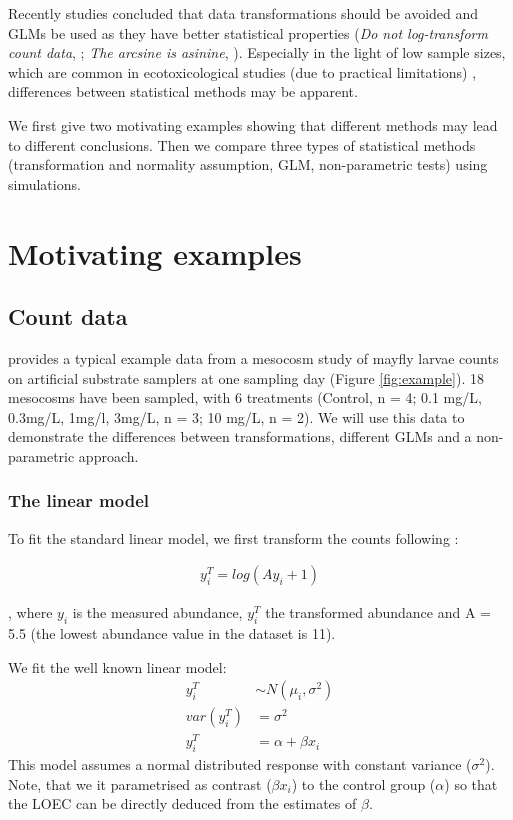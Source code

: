 \documentclass{scrartcl}
\begin{document}
Recently studies concluded that data transformations should be avoided and GLMs be used as they have better statistical properties (\emph{Do not log-transform count data}, \citep{ohara_not_2010}; \emph{The arcsine is asinine}, \citep{warton_arcsine_2011}).
Especially in the light of low sample sizes, which are common in ecotoxicological studies (due to practical limitations) \citep{sanderson_pesticide_2002,szocs_analysing_2015}, differences between statistical methods may be apparent. 

We first give two motivating examples showing that different methods may lead to different conclusions. 
Then we compare three types of statistical methods (transformation and normality assumption, GLM, non-parametric tests) using simulations.


\section{Motivating examples}
\subsection{Count data}
\citet{brock_minimum_2014} provides a typical example data from a mesocosm study of mayfly larvae counts on artificial substrate samplers at one sampling day (Figure \ref{fig:example}). 
18 mesocosms have been sampled, with 6 treatments (Control, n = 4; 0.1 mg/L, 0.3mg/L, 1mg/l, 3mg/L, n = 3; 10 mg/L, n = 2).
We will use this data to demonstrate the differences between transformations, different GLMs and a non-parametric approach.

\subsubsection{The linear model}
To fit the standard linear model, we first transform the counts following \citet{van_den_brink_impact_2000}:

\begin{align}
  y^T_i = log(Ay_i + 1) \label{eqn:trans}
\end{align}

, where $y_i$ is the measured abundance, $y_i^T$ the transformed abundance and A = 5.5 (the lowest abundance value in the dataset is 11).

We fit the well known linear model:
\begin{align}
  y_i^T &\sim N(\mu_i, \sigma^2) \nonumber \\
  var(y_i^T) &= \sigma^2 \label{eqn:normal} \\
  y_i^T &= \alpha + \beta x_i \nonumber
\end{align}
This model assumes a normal distributed response with constant variance ($\sigma^2$).
Note, that we it parametrised as contrast ($\beta x_i$) to the control group ($\alpha$) so that the LOEC can be directly deduced from the estimates of $\beta$.
\end{document}
